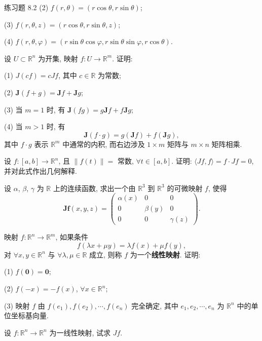 \begin{exblock}{练习题 8.2}
  (2) $f(r, \theta) = (r\cos\theta, r\sin\theta)$;

  (3) $f(r, \theta, z) = (r\cos\theta, r\sin\theta, z)$;

  (4) $f(r, \theta, \varphi) = (r\sin\theta\cos\varphi, r\sin\theta\sin\varphi, r\cos\theta)$.

  \item 设 $U \subset \mathbb{R}^{n}$ 为开集, 映射 $f: U \to \mathbb{R}^{m}$. 证明:

  (1) $J(cf) = cJf$, 其中 $c \in \mathbb{R}$ 为常数;

  (2) $\boldsymbol{J}(f + g) = \boldsymbol{J}f + \boldsymbol{J}g$;

  (3) 当 $m = 1$ 时, 有 $\boldsymbol{J}(fg) = g\boldsymbol{J}f + f\boldsymbol{J}g$;

  (4) 当 $m > 1$ 时, 有
  \[
    \boldsymbol{J}(f \cdot g) = g(\boldsymbol{J}f) + f(\boldsymbol{J}g),
  \]
  其中 $f \cdot g$ 表示 $\mathbb{R}^{m}$ 中通常的内积, 而右边涉及 $1 \times m$ 矩阵与 $m \times n$ 矩阵相乘.

  \item 设 $f: [a, b] \to \mathbb{R}^{n}$, 且 $\|f(t)\| =$ 常数, $\forall t \in [a, b]$. 证明: $\langle Jf, f\rangle = f \cdot Jf = 0$, 并对此式作出几何解释.

  \item 设 $\alpha$, $\beta$, $\gamma$ 为 $\mathbb{R}$ 上的连续函数, 求出一个由 $\mathbb{R}^{3}$ 到 $\mathbb{R}^{3}$ 的可微映射 $f$, 使得
  \[
    \boldsymbol{J}\boldsymbol{f}(x, y, z) = \begin{pmatrix} \alpha(x) & 0 & 0 \\ 0 & \beta(y) & 0 \\ 0 & 0 & \gamma(z) \end{pmatrix}.
  \]

  \item 映射 $f: \mathbb{R}^{n} \to \mathbb{R}^{m}$, 如果条件
  \[
    f(\lambda x + \mu y) = \lambda f(x) + \mu f(y),
  \]
  对 $\forall x, y \in \mathbb{R}^{n}$ 与 $\forall \lambda, \mu \in \mathbb{R}$ 成立, 则称 $f$ 为一个\textbf{线性映射}. 证明:

  (1) $f(\boldsymbol{0}) = \boldsymbol{0}$;

  (2) $f(-x) = -f(x)$, $\forall x \in \mathbb{R}^{n}$;

  (3) 映射 $f$ 由 $f(e_{1}), f(e_{2}), \cdots, f(e_{n})$ 完全确定, 其中 $e_{1}, e_{2}, \cdots, e_{n}$ 为 $\mathbb{R}^{n}$ 中的单位坐标基向量.

  \item 设 $f: \mathbb{R}^{n} \to \mathbb{R}^{n}$ 为一线性映射, 试求 $Jf$.


\end{exblock}
